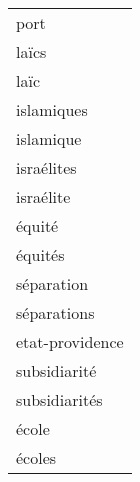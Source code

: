 \begin{table}[h]
\begin{center}
\begin{tabular}{|l|}
port\\
laïcs\\
laïc\\
islamiques\\
islamique\\
israélites\\
israélite\\
équité\\
équités\\
séparation\\
séparations\\
etat-providence\\
subsidiarité\\
subsidiarités\\
école\\
écoles\\
\hline
\end{tabular}


\end{center}
\end{table}
